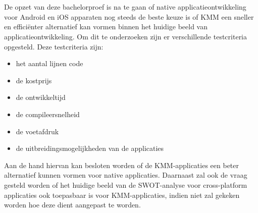 \section{}
\label{sec:onderzoeksvraag}

De opzet van deze bachelorproef is na te gaan of native applicatieontwikkeling voor Android en iOS apparaten nog steeds de beste keuze is of KMM een sneller en efficiënter alternatief kan vormen binnen het huidige beeld van applicatieontwikkeling. Om dit te onderzoeken zijn er verschillende testcriteria opgesteld. Deze testcriteria zijn: 
\begin{itemize}
    \item het aantal lijnen code
    \item de kostprijs
    \item de ontwikkeltijd
    \item de compileersnelheid
    \item de voetafdruk
    \item de uitbreidingsmogelijkheden van de applicaties
\end{itemize}
Aan de hand hiervan kan besloten worden of de KMM-applicaties een beter alternatief kunnen vormen voor native applicaties. Daarnaast zal ook de vraag gesteld worden of het huidige beeld van de SWOT-analyse voor cross-platform applicaties ook toepasbaar is voor KMM-applicaties, indien niet zal gekeken worden hoe deze dient aangepast te worden. 


\section{}
\label{sec:onderzoeksdoelstelling}

